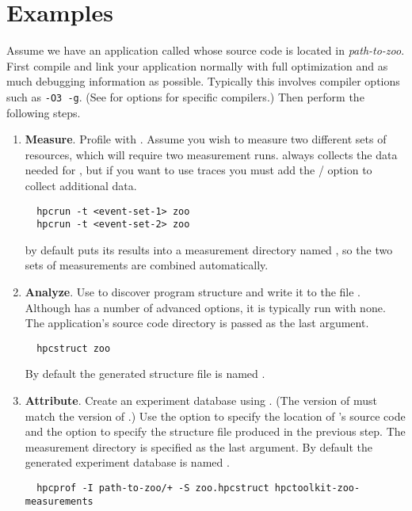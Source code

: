 \documentclass[english]{article}
\begin{document}
\section{Examples}

Assume we have an application called  whose source code is located in \emph{path-to-zoo}.
First compile and link your application normally with full optimization
and as much debugging information as possible.
Typically this involves compiler options such as \verb+-O3 -g+.
(See  for options for specific compilers.)
Then perform the following steps.

\begin{enumerate}

\item \textbf{Measure}.
Profile with .
Assume you wish to measure two different sets of resources,
which will require two measurement runs.
 always collects the data needed for ,
but if you want to use traces you must add
the  /  option to collect additional data.
\begin{verbatim}
  hpcrun -t <event-set-1> zoo
  hpcrun -t <event-set-2> zoo
\end{verbatim}

 by default puts its results into a measurement directory
named ,
so the two sets of measurements are combined automatically.

\item \textbf{Analyze}. 
Use  to discover program structure
and write it to the file .
Although  has a number of advanced options, it is typically run with none.
The application's source code directory is passed as the last argument.
\begin{verbatim}
  hpcstruct zoo
\end{verbatim}

By default the generated structure file is named .

\item \textbf{Attribute}.
Create an experiment database using .
(The version of  must match
the version of .)
Use the  option to specify the location of 's source code
and the  option to specify the structure file produced in the previous step.
The measurement directory is specified as the last argument.
By default the generated experiment database is named .
\begin{verbatim}
  hpcprof -I path-to-zoo/+ -S zoo.hpcstruct hpctoolkit-zoo-measurements
\end{verbatim}


\end{enumerate}
\end{document}
